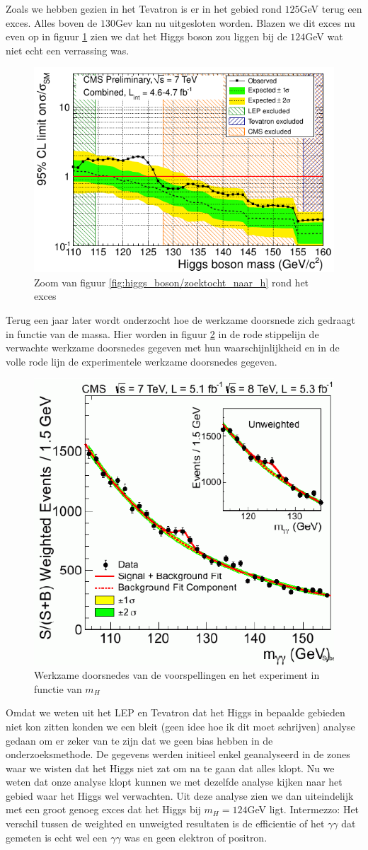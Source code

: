 \documentclass[../main.tex]{subfiles}
\begin{document}
Zoals we hebben gezien in het Tevatron is er in het gebied rond $125$GeV terug een exces. Alles boven de $130$Gev kan nu uitgesloten worden. Blazen we dit exces nu even op in figuur \ref{fig:higgs_boson/zoektocht_h_zoom} zien we dat het Higgs boson zou liggen bij de $124$GeV wat niet echt een verrassing was.

\begin{figure}[h]
    \centering
    \includegraphics[width=0.6\linewidth]{higgs_boson/zoektocht_h_zoom.png}
    \caption{Zoom van figuur \ref{fig:higgs_boson/zoektocht_naar_h} rond het exces}%
    \label{fig:higgs_boson/zoektocht_h_zoom}
\end{figure}

Terug een jaar later wordt onderzocht hoe de werkzame doorsnede zich gedraagt in functie van de massa. Hier worden in figuur \ref{fig:higgs_boson/sigma_h_zoektocht} in de rode stippelijn de verwachte werkzame doorsnedes gegeven met hun waarschijnlijkheid en in de volle rode lijn de experimentele werkzame doorsnedes gegeven.

\begin{figure}[h]
    \centering
    \includegraphics[width=0.4\linewidth]{higgs_boson/sigma_h_zoektocht.png}
    \caption{Werkzame doorsnedes van de voorspellingen en het experiment in functie van $m_H$}%
    \label{fig:higgs_boson/sigma_h_zoektocht}
\end{figure}

Omdat we weten uit het LEP en Tevatron dat het Higgs in bepaalde gebieden niet kon zitten konden we een bleit (geen idee hoe ik dit moet schrijven) analyse gedaan om er zeker van te zijn dat we geen bias hebben in de onderzoeksmethode. De gegevens werden initieel enkel geanalyseerd in de zones waar we wisten dat het Higgs niet zat om na te gaan dat alles klopt. Nu we weten dat onze analyse klopt kunnen we met dezelfde analyse kijken naar het gebied waar het Higgs wel verwachten. Uit deze analyse zien we dan uiteindelijk met een groot genoeg exces dat het Higgs bij $m_H=124$GeV ligt. {\color{blue} Intermezzo: Het verschil tussen de weighted en unweigted resultaten is de efficientie of het $\gamma\gamma$ dat gemeten is echt wel een $\gamma\gamma$ was en geen elektron of positron.}
\end{document}
